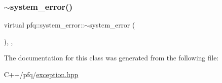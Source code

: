 \mbox{\label{classpfq_1_1system__error_aba87ae84b44c7dda02cabbc85192ab47}} 
\subsubsection{\texorpdfstring{$\sim$system\+\_\+error()}{~system\_error()}}
{\footnotesize\ttfamily virtual pfq\+::system\+\_\+error\+::$\sim$system\+\_\+error (\begin{DoxyParamCaption}{ }\end{DoxyParamCaption})\hspace{0.3cm}{\ttfamily [inline]}, {\ttfamily [virtual]}, {\ttfamily [noexcept]}}



The documentation for this class was generated from the following file\+:\begin{DoxyCompactItemize}
\item 
C++/pfq/\hyperlink{exception_8hpp}{exception.\+hpp}\end{DoxyCompactItemize}

